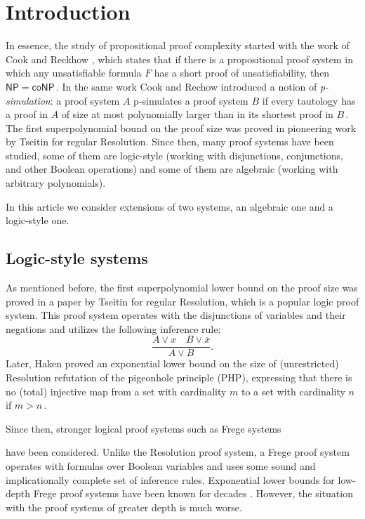 \documentclass{toc}
\begin{document}
\section{Introduction}
In essence, the study of propositional proof complexity started with the work of Cook and Reckhow \cite{CR79}, which states that if there is a propositional proof system in which any unsatisfiable formula $F$ has a short proof of unsatisfiability, then %
$\mathsf{NP} = \mathsf{coNP}\,.$ %
 In the same work Cook and Rechow introduced a notion of \textit{p-simulation}: a proof system
$A$ p-simulates a proof system $B$ if every tautology has a proof in $A$ of size at most polynomially larger than in its shortest proof in %
$B\,.$ %
 The first %
  superpolynomial 
bound on the proof size was proved in %
pioneering work by  %
Tseitin \cite{Tse68} for regular %
Resolution. %
Since then, many proof systems have been studied, some of them are logic-style (working with disjunctions, conjunctions, and other Boolean operations) and some of them are algebraic (working with arbitrary polynomials).

In this %
article  %
we consider extensions of two systems, an algebraic one and a logic-style one. 

%
\subsection{Logic-style systems} %
As %
mentioned before, the first superpolynomial
lower  %
bound on the proof size was proved in %
a paper by  %
Tseitin for regular %
Resolution, %
%
which is a popular logic proof system. This proof system operates with the disjunctions of variables and their negations and utilizes the following inference rule:
$$
\frac{A \vee x \quad B \vee \overline{x}}{A \vee B}.
$$
Later, Haken \cite{Hak85} proved an exponential lower bound on the size of (unrestricted) Resolution refutation of the pigeonhole principle (PHP), expressing that there is no (total)
injective map from a set with cardinality $m$ to a set with cardinality $n$ if %
$m > n\,.$ %

Since then, stronger logical proof systems such as Frege systems
%
%
%

%
have been  %
considered. Unlike
the  %
%
Resolution %
proof system, a Frege proof system operates with formulas over Boolean variables and uses some sound and implicationally complete set of inference rules. Exponential lower bounds for low-depth 
Frege proof systems %
have been  %
known for decades \cite{Ajt88, doi:10.1137/0221068,Has20}. However, the situation with the
%
%
%
%
proof systems of greater depth is much worse.
%
\end{document}
